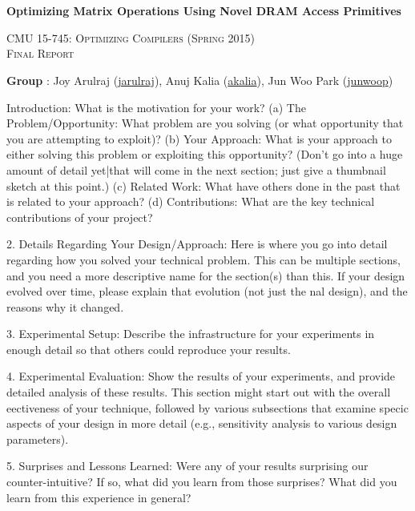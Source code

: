 \documentclass[letterpaper]{article}
\makeatletter
\newcommand{\email}[1]{\href{mailto:#1@cs.cmu.edu}{#1}}
\makeatother
\begin{document}
\section*{}
\begin{center}
  \centerline{\textbf{\Large Optimizing Matrix Operations Using Novel DRAM
  Access Primitives}}
  \vspace{1em}
  \textsc{\large CMU 15-745: Optimizing Compilers (Spring 2015)} \\
  \vspace{1em}
  \textsc{\large Final Report} \\
  \vspace{3em}
  \centerline{\large{\textbf{Group} : Joy Arulraj (\email{jarulraj}), Anuj Kalia
  (\email{akalia})}, Jun Woo Park (\email{junwoop}) }
  \vspace{1em}
\end{center}

Introduction:
What is the motivation for your work?
(a)
The Problem/Opportunity:
What  problem  are  you  solving  (or  what  opportunity
that you are attempting to exploit)?
(b)
Your Approach:
What is your approach to either solving this problem or exploiting
this opportunity?  (Don't go into a huge amount of detail yet|that will come in the
next section; just give a thumbnail sketch at this point.)
(c)
Related Work:
What have others done in the past that is related to your approach?
(d)
Contributions:
What are the key technical contributions of your project?

2.
Details Regarding Your Design/Approach:
Here is where you go into detail regarding
how you solved your technical problem.  This can be multiple sections, and you need a more
descriptive name for the section(s) than this.  If your design evolved over time, please explain
that evolution (not just the nal design), and the reasons why it changed.

3.
Experimental Setup:
Describe the infrastructure for your experiments in enough detail so
that others could reproduce your results.

4.
Experimental Evaluation:
Show  the  results  of  your  experiments,  and  provide  detailed
analysis of these results.  This section might start out with the overall eectiveness of your
technique,  followed  by  various  subsections  that  examine  specic  aspects  of  your  design  in
more detail (e.g., sensitivity analysis to various design parameters).

5.
Surprises and Lessons Learned:
Were any of your results surprising our counter-intuitive?
If so, what did you learn from those surprises?  What did you learn from this experience in
general?
\end{document}
